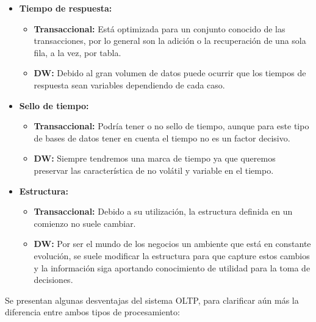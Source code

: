 \documentclass[a4paper,11pt]{article}
\begin{document}
\begin{itemize}
\begin{itemize}
        \end{itemize}
      \item \textbf{Tiempo de respuesta:}
        \begin{itemize}
          \item \textbf{Transaccional:} Está optimizada para un conjunto conocido de las transacciones, por lo general son la adición o la recuperación de
          una sola fila, a la vez, por tabla.
          \item \textbf{DW:} Debido al gran volumen de datos puede ocurrir que los tiempos de respuesta sean variables dependiendo de cada caso.
        \end{itemize}
      \item \textbf{Sello de tiempo:}
        \begin{itemize}
          \item \textbf{Transaccional:} Podría tener o no sello de tiempo, aunque para este tipo de bases de datos tener en cuenta el tiempo no es un
          factor decisivo.
          \item \textbf{DW:} Siempre tendremos una marca de tiempo ya que queremos preservar las característica de no volátil y variable en el tiempo.
        \end{itemize}
      \item \textbf{Estructura:}
        \begin{itemize}
          \item \textbf{Transaccional:} Debido a su utilización, la estructura definida en un comienzo no suele cambiar.
          \item \textbf{DW:} Por ser el mundo de los negocios un ambiente que está en constante evolución, se suele modificar la estructura para que capture
          estos cambios y la información siga aportando conocimiento de utilidad para la toma de decisiones.
        \end{itemize}
    \end{itemize}
    
    Se presentan algunas desventajas del sistema OLTP, para clarificar aún más la diferencia entre ambos tipos de procesamiento:
    
\end{document}
